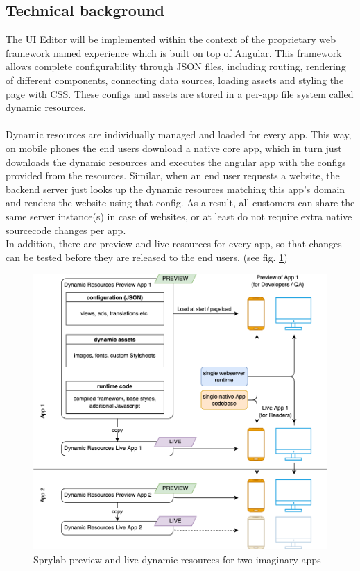 \subsection{Technical background}

The UI Editor will be implemented within the context of the proprietary web framework named \Gls{experience} which is built on top of Angular.
This framework allows complete configurability through JSON files, including routing, rendering of different components, connecting data sources, loading assets and styling the page with CSS.
These configs and assets are stored in a per-app file system called \label{def:DynamicResources} dynamic resources.
\\\\
Dynamic resources are individually managed and loaded for every app. This way, on mobile phones the end users download a native core app, which in turn just downloads the dynamic resources and executes the angular app with the configs provided from the resources.
Similar, when an end user requests a website, the backend server just looks up the dynamic resources matching this app's domain and renders the website using that config.
As a result, all customers can share the same server instance(s) in case of websites, or at least do not require extra native sourcecode changes per app.
\\
In addition, there are preview and live resources for every app, so that changes can be tested before they are released to the end users. (see fig. \ref{fig:dynres})
\begin{figure}[h!]
  \includegraphics[width=\linewidth]{pics/experience_resources.drawio.png}
  \caption{Sprylab preview and live dynamic resources for two imaginary apps}
  \label{fig:dynres}
\end{figure}
